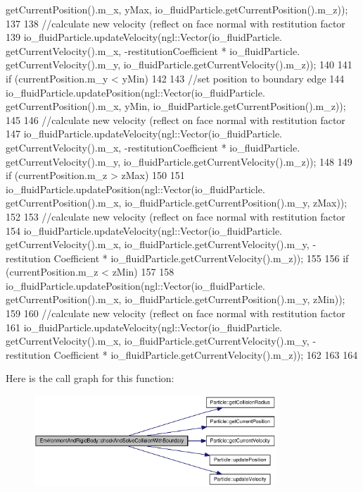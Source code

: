 \begin{DoxyCode}
{{      getCurrentPosition().m_x, yMax, io_fluidParticle.getCurrentPosition().m_z));
137 
138         //calculate new velocity (reflect on face normal with restitution factor
139         io_fluidParticle.updateVelocity(ngl::Vector(io_fluidParticle.
      getCurrentVelocity().m_x, -restitutionCoefficient * io_fluidParticle.
      getCurrentVelocity().m_y, io_fluidParticle.getCurrentVelocity().m_z));
140     }
141     if (currentPosition.m_y < yMin)
142     {
143         //set position to boundary edge
144         io_fluidParticle.updatePosition(ngl::Vector(io_fluidParticle.
      getCurrentPosition().m_x, yMin, io_fluidParticle.getCurrentPosition().m_z));
145 
146         //calculate new velocity (reflect on face normal with restitution factor
147         io_fluidParticle.updateVelocity(ngl::Vector(io_fluidParticle.
      getCurrentVelocity().m_x, -restitutionCoefficient * io_fluidParticle.
      getCurrentVelocity().m_y, io_fluidParticle.getCurrentVelocity().m_z));
148     }
149     if (currentPosition.m_z > zMax)
150     {
151         io_fluidParticle.updatePosition(ngl::Vector(io_fluidParticle.
      getCurrentPosition().m_x, io_fluidParticle.getCurrentPosition().m_y, zMax));
152 
153         //calculate new velocity (reflect on face normal with restitution factor
154         io_fluidParticle.updateVelocity(ngl::Vector(io_fluidParticle.
      getCurrentVelocity().m_x, io_fluidParticle.getCurrentVelocity().m_y, -restitution
      Coefficient * io_fluidParticle.getCurrentVelocity().m_z));
155     }
156     if (currentPosition.m_z < zMin)
157     {
158         io_fluidParticle.updatePosition(ngl::Vector(io_fluidParticle.
      getCurrentPosition().m_x, io_fluidParticle.getCurrentPosition().m_y, zMin));
159 
160         //calculate new velocity (reflect on face normal with restitution factor
161         io_fluidParticle.updateVelocity(ngl::Vector(io_fluidParticle.
      getCurrentVelocity().m_x, io_fluidParticle.getCurrentVelocity().m_y, -restitution
      Coefficient * io_fluidParticle.getCurrentVelocity().m_z));
162     }
163 
164 }
\end{DoxyCode}




Here is the call graph for this function:\nopagebreak
\begin{figure}[H]
\begin{center}
\leavevmode
\includegraphics[width=259pt]{class_environment_and_rigid_body_ad2f2263fff1ed7f94bb920b7970bdfa3_cgraph}
\end{center}
\end{figure}




